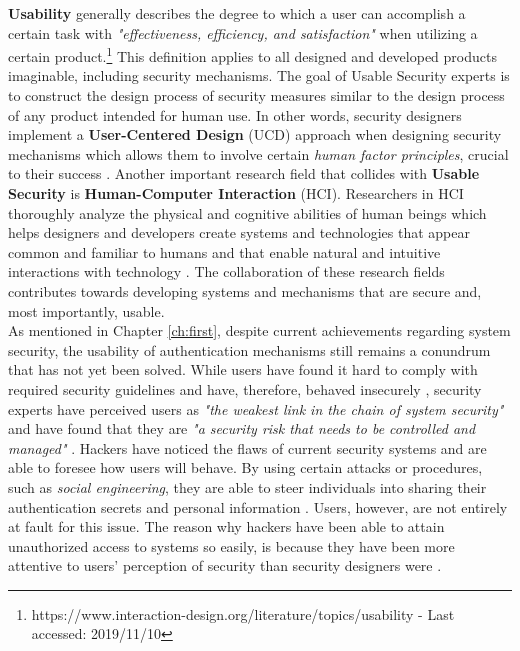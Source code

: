 \textbf{Usability} generally describes the degree to which a user can accomplish a certain task with \textit{"effectiveness, efficiency, and satisfaction"} when utilizing a certain product.\footnote{https://www.interaction-design.org/literature/topics/usability - Last accessed: 2019/11/10} This definition applies to all designed and developed products imaginable, including security mechanisms. The goal of Usable Security experts is to construct the design process of security measures similar to the design process of any product intended for human use. In other words, security designers implement a \textbf{User-Centered Design} (UCD) approach when designing security mechanisms which allows them to involve certain \textit{human factor principles}, crucial to their success \cite{Adams:1999:UE:322796.322806, sasse, Butz2014}. Another important research field that collides with \textbf{Usable Security} is \textbf{Human-Computer Interaction} (HCI). Researchers in HCI thoroughly analyze the physical and cognitive abilities of human beings which helps designers and developers create systems and technologies that appear common and familiar to humans and that enable natural and intuitive interactions with technology \cite{Butz2014}. The collaboration of these research fields contributes towards developing systems and mechanisms that are secure and, most importantly, usable.\\ 

As mentioned in Chapter \ref{ch:first}, despite current achievements regarding system security, the usability of authentication mechanisms still remains a conundrum that has not yet been solved. While users have found it hard to comply with required security guidelines and have, therefore, behaved insecurely \cite{Adams:1999:UE:322796.322806, sasse}, security experts have perceived users as \textit{"the weakest link in the chain of system security"} \cite{sasse} and have found that they are \textit{"a security risk that needs to be controlled and managed"}  \cite{Adams:1999:UE:322796.322806}. Hackers have noticed the flaws of current security systems and are able to foresee how users will behave. By using certain attacks or procedures, such as  \textit{social engineering}, they are able to steer individuals into sharing their authentication secrets and personal information \cite{Adams:1999:UE:322796.322806, sasse}. Users, however, are not entirely at fault for this issue. The reason why hackers have been able to attain unauthorized access to systems so easily, is because they have been more attentive to users' perception of security than security designers were \cite{Adams:1999:UE:322796.322806}. 

